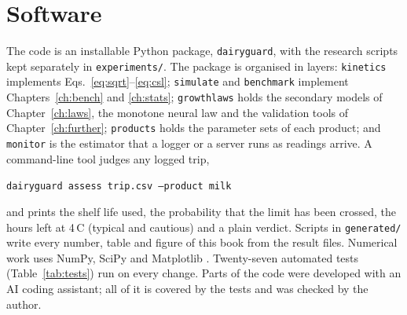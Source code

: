 \documentclass[11pt,a4paper,twoside,openany]{book}
\newcommand{\degC}{\,\textdegree C}
\theoremstyle{plain}\newtheorem{proposition}{Proposition}\newtheorem{corollary}{Corollary}
\theoremstyle{definition}\newtheorem{definition}{Definition}[chapter]
\begin{document}
\section{Software}
The code is an installable Python package, \texttt{dairyguard}, with the research scripts kept separately in \texttt{experiments/}. The package is organised in layers: \texttt{kinetics} implements Eqs.~\eqref{eq:sqrt}--\eqref{eq:csl}; \texttt{simulate} and \texttt{benchmark} implement Chapters~\ref{ch:bench} and \ref{ch:stats}; \texttt{growthlaws} holds the secondary models of Chapter~\ref{ch:laws}, the monotone neural law and the validation tools of Chapter~\ref{ch:further}; \texttt{products} holds the parameter sets of each product; and \texttt{monitor} is the estimator that a logger or a server runs as readings arrive. A command-line tool judges any logged trip,
\begin{center}\texttt{dairyguard assess trip.csv --product milk}\end{center}
and prints the shelf life used, the probability that the limit has been crossed, the hours left at 4\degC{} (typical and cautious) and a plain verdict. Scripts in \texttt{generated/} write every number, table and figure of this book from the result files. Numerical work uses NumPy, SciPy and Matplotlib \cite{harris2020,virtanen2020,hunter2007}. Twenty-seven automated tests (Table~\ref{tab:tests}) run on every change. Parts of the code were developed with an AI coding assistant; all of it is covered by the tests and was checked by the author.
\end{document}

